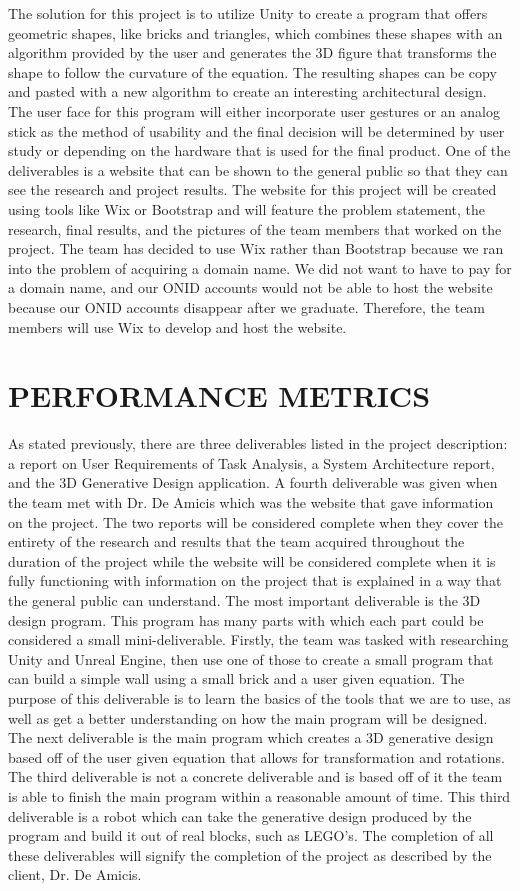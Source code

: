 \documentclass[letterpaper,draftclsnofoot,onecolumn,10 pt]{IEEEtran}
\begin{document}
The solution for this project is to utilize Unity to create a program that offers geometric shapes, like bricks and triangles, which combines these shapes with an algorithm provided by the user and generates the 3D figure that transforms the shape to follow the curvature of the equation. The resulting shapes can be copy and pasted with a new algorithm to create an interesting architectural design. The user face for this program will either incorporate user gestures or an analog stick as the method of usability and the final decision will be determined by user study or depending on the hardware that is used for the final product. One of the deliverables is a website that can be shown to the general public so that they can see the research and project results. The website for this project will be created using tools like Wix or Bootstrap and will feature the problem statement, the research, final results, and the pictures of the team members that worked on the project.  The team has decided to use Wix rather than Bootstrap because we ran into the problem of acquiring a domain name. We did not want to have to pay for a domain name, and our ONID  accounts would not be able to host the website because our ONID accounts disappear after we graduate. Therefore, the team members will use Wix to develop and host the website.

\section{PERFORMANCE METRICS}

As stated previously, there are three deliverables listed in the project description: a report on User Requirements of Task Analysis, a System Architecture report, and the 3D Generative Design application. A fourth deliverable was given when the team met with Dr. De Amicis which was the website that gave information on the project. The two reports will be considered complete when they cover the entirety of the research and results that the team acquired throughout the duration of the project while the website will be considered complete when it is fully functioning with information on the project that is explained in a way that the general public can understand. The most important deliverable is the 3D design program. This program has many parts with which each part could be considered a small mini-deliverable. Firstly, the team was tasked with researching Unity and Unreal Engine, then use one of those to create a small program that can build a simple wall using a small brick and a user given equation. The purpose of this deliverable is to learn the basics of the tools that we are to use, as well as get a better understanding on how the main program will be designed. The next deliverable is the main program which creates a 3D generative design based off of the user given equation that allows for transformation and rotations. The third deliverable is not a concrete deliverable and is based off of it the team is able to finish the main program within a reasonable amount of time. This third deliverable is a robot which can take the generative design produced by the program and build it out of real blocks, such as LEGO’s. The completion of all these deliverables will signify the completion of the project as described by the client, Dr. De Amicis.
\end{document}
